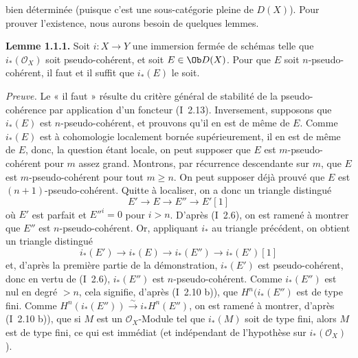 bien déterminée (puisque c'est une sous-catégorie pleine de \(D(X)\)). Pour prouver l'existence, nous aurons besoin de quelques lemmes.

\textbf{Lemme 1.1.1.} Soit \(i:X\to Y\) une immersion fermée de schémas telle que \(i_*(\mathcal O_X)\) soit pseudo-cohérent, et soit \(E\in\Ob D(X)\). Pour que \(E\) soit \(n\)-pseudo-cohérent, il faut et il suffit que \(i_*(E)\) le soit.

\emph{Preuve.} Le « il faut » résulte du critère général de stabilité de la pseudo-cohérence par application d'un foncteur (I~2.13). Inversement, supposons que \(i_*(E)\) est \(n\)-pseudo-cohérent, et prouvons qu'il en est de même de \(E\). Comme \(i_*(E)\) est à cohomologie localement bornée supérieurement, il en est de même de \(E\), donc, la question étant locale, on peut supposer que \(E\) est \(m\)-pseudo-cohérent pour \(m\) assez grand. Montrons, par récurrence descendante sur \(m\), que \(E\) est \(m\)-pseudo-cohérent pour tout \(m\geq n\). On peut supposer déjà prouvé que \(E\) est \((n+1)\)-pseudo-cohérent. Quitte à localiser, on a donc un triangle distingué
\[
E'\longrightarrow E\longrightarrow E''\longrightarrow E'[1]
\]
où \(E'\) est parfait et \(E''^i=0\) pour \(i>n\). D'après (I~2.6), on est ramené à montrer que \(E''\) est \(n\)-pseudo-cohérent. Or, appliquant \(i_*\) au triangle précédent, on obtient un triangle distingué
\[
i_*(E')\longrightarrow i_*(E)\longrightarrow i_*(E'')\longrightarrow i_*(E')[1]
\]
et, d'après la première partie de la démonstration, \(i_*(E')\) est pseudo-cohérent, donc en vertu de (I~2.6), \(i_*(E'')\) est \(n\)-pseudo-cohérent. Comme \(i_*(E'')\) est nul en degré \(>n\), cela signifie, d'après (I~2.10 b)), que \(H^n(i_*(E'')\) est de type fini. Comme \(H^n(i_*(E''))\xrightarrow{\sim}i_*H^n(E'')\), on est ramené à montrer, d'après (I~2.10 b)), que si \(M\) est un \(\mathcal O_X\)-Module tel que \(i_*(M)\) soit de type fini, alors \(M\) est de type fini, ce qui est immédiat (et indépendant de l'hypothèse sur \(i_*(\mathcal O_X)\)).

